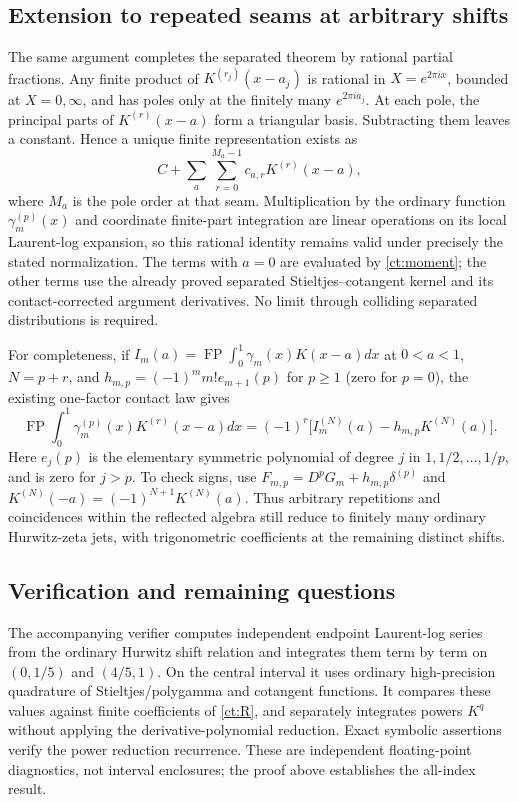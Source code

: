 \subsection{Extension to repeated seams at arbitrary shifts}

The same argument completes the separated theorem by rational partial
fractions. Any finite product of $K^{(r_j)}(x-a_j)$ is rational in
$X=e^{2\pi ix}$, bounded at $X=0,\infty$, and has poles only at the
finitely many $e^{2\pi ia_j}$. At each pole, the principal parts of
$K^{(r)}(x-a)$ form a triangular basis. Subtracting them leaves a
constant. Hence a unique finite representation exists as
\[
 C+\sum_a\sum_{r=0}^{M_a-1}c_{a,r}K^{(r)}(x-a),
\]
where $M_a$ is the pole order at that seam. Multiplication by the ordinary
function $\gamma_m^{(p)}(x)$ and coordinate finite-part integration are
linear operations on its local Laurent-log expansion, so this rational
identity remains valid under precisely the stated normalization. The
terms with $a=0$ are evaluated by \eqref{ct:moment}; the other terms use
the already proved separated Stieltjes--cotangent kernel and its
contact-corrected argument derivatives. No limit through colliding
separated distributions is required.

For completeness, if
$I_m(a)=\operatorname{FP}\int_0^1\gamma_m(x)K(x-a)dx$ at $0<a<1$,
$N=p+r$, and
$h_{m,p}=(-1)^m m!e_{m+1}(p)$ for $p\ge1$ (zero for $p=0$),
the existing one-factor contact law \cite{RepoMain,RepoTriple} gives
\[
 \operatorname{FP}\int_0^1\gamma_m^{(p)}(x)K^{(r)}(x-a)dx
       =(-1)^r\bigl[I_m^{(N)}(a)-h_{m,p}K^{(N)}(a)\bigr].
\]
Here $e_j(p)$ is the elementary symmetric polynomial of degree $j$ in
$1,1/2,\ldots,1/p$, and is zero for $j>p$. To check signs, use
$F_{m,p}=D^pG_m+h_{m,p}\delta^{(p)}$ and
$K^{(N)}(-a)=(-1)^{N+1}K^{(N)}(a)$. Thus arbitrary repetitions and
coincidences within the reflected algebra still reduce to finitely many
ordinary Hurwitz-zeta jets, with trigonometric coefficients at the
remaining distinct shifts.

\subsection{Verification and remaining questions}

The accompanying verifier computes independent endpoint Laurent-log
series from the ordinary Hurwitz shift relation and integrates them
term by term on $(0,1/5)$ and $(4/5,1)$. On the central interval it uses
ordinary high-precision quadrature of Stieltjes/polygamma and cotangent
functions. It compares these values against finite coefficients of
\eqref{ct:R}, and separately integrates powers $K^q$ without applying
the derivative-polynomial reduction. Exact symbolic assertions verify
the power reduction recurrence. These are independent floating-point
diagnostics, not interval enclosures; the proof above establishes the
all-index result.

